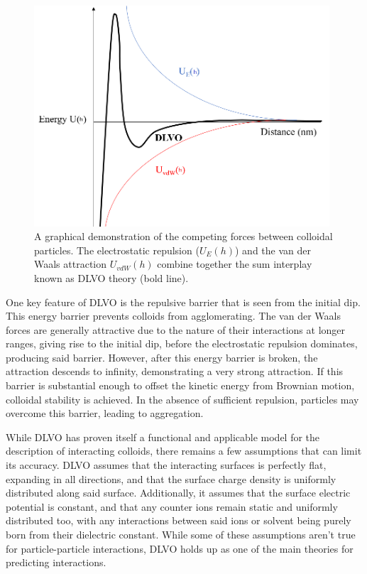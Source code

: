 \begin{figure}[h]     %
        \begin{center}
          \includegraphics[width=110mm]{chapter1/DLVO.PNG}
\end{center}
\caption{A graphical demonstration of the competing forces between colloidal particles. The electrostatic repulsion ($U_E(h)$) and the van der Waals attraction $U_{vdW}(h)$ combine together the sum interplay known as DLVO theory (bold line).}
\label{fig:DLVO}                 %
\end{figure}

One key feature of DLVO is the repulsive barrier that is seen from the initial dip. This energy barrier prevents colloids from agglomerating. The van der Waals forces are generally attractive due to the nature of their interactions at longer ranges, giving rise to the initial dip, before the electrostatic repulsion dominates, producing said barrier. However, after this energy barrier is broken, the attraction descends to infinity, demonstrating a very strong attraction. If this barrier is substantial enough to offset the kinetic energy from Brownian motion, colloidal stability is achieved. In the absence of sufficient repulsion, particles may overcome this barrier, leading to aggregation.

While DLVO has proven itself a functional and applicable model for the description of interacting colloids, there remains a few assumptions that can limit its accuracy. DLVO assumes that the interacting surfaces is perfectly flat, expanding in all directions, and that the surface charge density is uniformly distributed along said surface. Additionally, it assumes that the surface electric potential is constant, and that any counter ions remain static and uniformly distributed too, with any interactions between said ions or solvent being purely born from their dielectric constant. While some of these assumptions aren't true for particle-particle interactions, DLVO holds up as one of the main theories for predicting interactions. \cite{particledep} \cite{effectHetSurf} \cite{colloidDepKin} \cite{chemDiscCharge} \cite{DLVOreview} 

